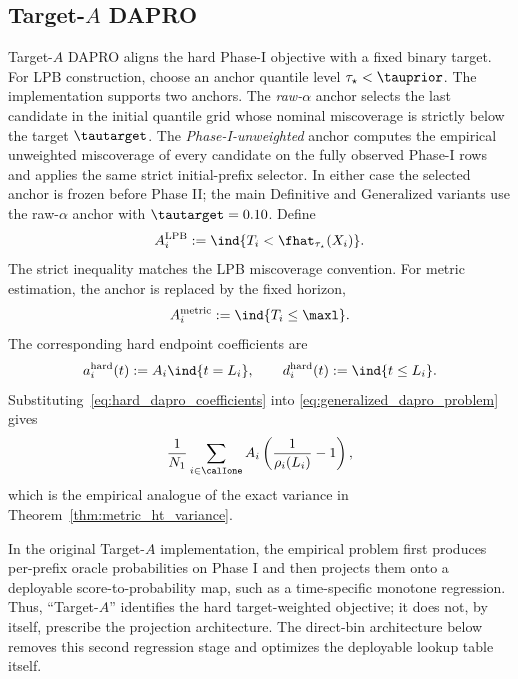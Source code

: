 \subsection{Target-$A$ DAPRO}

Target-$A$ DAPRO aligns the hard Phase-I objective with a fixed binary target.
For LPB construction, choose an anchor quantile level $\tau_\star<\tauprior$.
The implementation supports two anchors.  The \emph{raw-$\alpha$} anchor
selects the last candidate in the initial quantile grid whose nominal
miscoverage is strictly below the target $\tautarget$.  The
\emph{Phase-I-unweighted} anchor computes the empirical unweighted
miscoverage of every candidate on the fully observed Phase-I rows and applies
the same strict initial-prefix selector.  In either case the selected anchor
is frozen before Phase II; the main Definitive and Generalized variants use
the raw-$\alpha$ anchor with $\tautarget=0.10$.  Define
\begin{equation}
    A_i^{\mathrm{LPB}}
    :=\ind{T_i<\fhat_{\tau_\star}(X_i)}.
    \label{eq:lpb_target_a}
\end{equation}
The strict inequality matches the LPB miscoverage convention.  For metric
estimation, the anchor is replaced by the fixed horizon,
\begin{equation}
    A_i^{\mathrm{metric}}:=\ind{T_i\leq\maxl}.
    \label{eq:metric_target_a}
\end{equation}
The corresponding hard endpoint coefficients are
\begin{equation}
    a_i^{\mathrm{hard}}(t)
    :=A_i\ind{t=L_i},
    \qquad
    d_i^{\mathrm{hard}}(t):=\ind{t\leq L_i}.
    \label{eq:hard_dapro_coefficients}
\end{equation}
Substituting~\eqref{eq:hard_dapro_coefficients} into
\eqref{eq:generalized_dapro_problem} gives
\begin{equation}
    \frac{1}{N_1}\sum_{i\in\calIone}
    A_i\left(\frac{1}{\rho_i(L_i)}-1\right),
\end{equation}
which is the empirical analogue of the exact variance in
Theorem~\ref{thm:metric_ht_variance}.

In the original Target-$A$ implementation, the empirical problem first
produces per-prefix oracle probabilities on Phase I and then projects them
onto a deployable score-to-probability map, such as a time-specific monotone
regression.  Thus, ``Target-$A$'' identifies the hard target-weighted
objective; it does not, by itself, prescribe the projection architecture.
The direct-bin architecture below removes this second regression stage and
optimizes the deployable lookup table itself.

